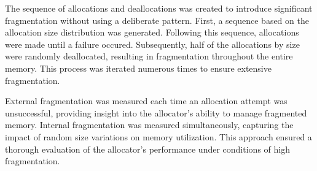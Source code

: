 The sequence of allocations and deallocations was created to introduce significant fragmentation without using a deliberate pattern. First, a sequence based on the allocation size distribution was generated. Following this sequence, allocations were made until a failure occured. Subsequently, half of the allocations by size were randomly deallocated, resulting in fragmentation throughout the entire memory. This process was iterated numerous times to ensure extensive fragmentation.

External fragmentation was measured each time an allocation attempt was unsuccessful, providing insight into the allocator’s ability to manage fragmented memory. Internal fragmentation was measured simultaneously, capturing the impact of random size variations on memory utilization. This approach ensured a thorough evaluation of the allocator's performance under conditions of high fragmentation.

